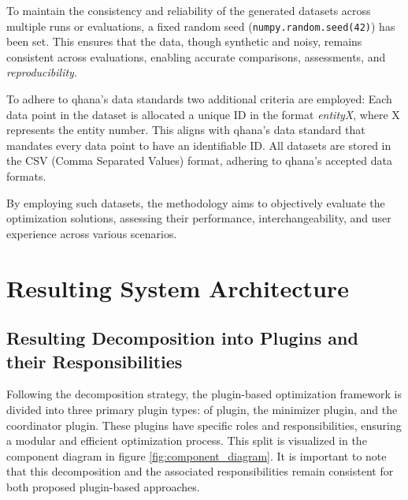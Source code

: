 \documentclass[
  a4paper,  %
  twoside,  %
  bibliography=totoc,
  headsepline,
  cleardoublepage=empty,
  parskip=half,
  draft=false
]{scrbook}
\begin{document}
To maintain the consistency and reliability of the generated datasets across multiple runs or evaluations, a fixed random seed (\texttt{numpy.random.seed(42)}) has been set.
This ensures that the data, though synthetic and noisy, remains consistent across evaluations, enabling accurate comparisons, assessments, and \emph{reproducibility}.

To adhere to \gls{qhana}'s data standards two additional criteria are employed:
Each data point in the dataset is allocated a unique ID in the format \emph{entityX}, where X represents the entity number.
This aligns with \gls{qhana}'s data standard that mandates every data point to have an identifiable ID.
All datasets are stored in the CSV (Comma Separated Values) format, adhering to \gls{qhana}'s accepted data formats.


% 



By employing such datasets, the methodology aims to objectively evaluate the optimization solutions, assessing their performance, interchangeability, and user experience across various scenarios.



\chapter{Resulting System Architecture}
\label{chap:architecture}


\section{Resulting Decomposition into Plugins and their Responsibilities}
\label{sec:resdecomposition}

Following the decomposition strategy, the plugin-based optimization framework is divided into three primary plugin types:
\gls{of} plugin, the minimizer plugin, and the coordinator plugin.
These plugins have specific roles and responsibilities, ensuring a modular and efficient optimization process.
This split is visualized in the component diagram in figure \ref{fig:component_diagram}.
It is important to note that this decomposition and the associated responsibilities remain consistent for both proposed plugin-based approaches.
\end{document}
